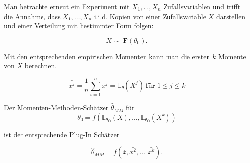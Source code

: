 \documentclass[10pt]{article}
\newcommand{\FZV}{X_1, \ldots, X_n} %
\newcommand{\EW}{\mathbb{E}} %
\begin{document}
	\noindent Man betrachte erneut ein Experiment mit $\FZV$ Zufallsvariablen und trifft die Annahme, dass $\FZV$ i.i.d. Kopien von einer Zufallsvariable $X$ darstellen und einer Verteilung mit bestimmter Form folgen:

\vspace{-2mm}
\begin{equation*}
	X \sim \; \textbf{F}(\theta_0).
\end{equation*}

	\noindent Mit den entsprechenden empirischen Momenten kann man die ersten $k$ Momente von $X$ berechnen. 

\begin{equation*}
	\bar{x^j} = \frac{1}{n} \sum_{i=1}^n x^j = \EW_\theta(X^j)\; \textbf{für} \; 1\leq j \leq k 
\end{equation*}

	\noindent Der Momenten-Methoden-Schätzer $\hat{\theta}_{MM}$ für 
\begin{equation*}
\theta_0 = f({\EW_\theta}_{0}(X),\ldots,{\EW_\theta}_{0}(X^k))
\end{equation*}

	\noindent ist der entsprechende Plug-In Schätzer

\begin{equation*}
	\hat{\theta}_{MM} = f(\bar{x},\bar{x^2}, \ldots, \bar{x^k}).
\end{equation*}
\end{document}
